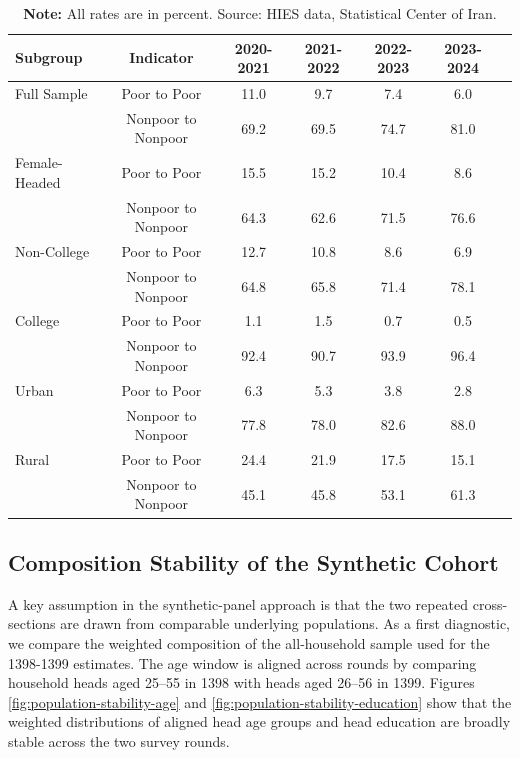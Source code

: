 \documentclass[12pt,a4paper]{article}
\begin{document}
\begin{table}[H]
\scriptsize
\centering
\caption{Key poverty transition rates across periods, by subgroup}
\label{tab:robustness_summary}
\begin{tabular}{lcccccc}
\toprule
Subgroup & Indicator & 2020-2021 & 2021-2022 & 2022-2023 & 2023-2024 \\
\midrule
Full Sample & Poor to Poor & 11.0 & 9.7 & 7.4 & 6.0 \\
& Nonpoor to Nonpoor & 69.2 & 69.5 & 74.7 & 81.0 \\
\addlinespace
Female-Headed & Poor to Poor & 15.5 & 15.2 & 10.4 & 8.6 \\
& Nonpoor to Nonpoor & 64.3 & 62.6 & 71.5 & 76.6 \\
\addlinespace
Non-College & Poor to Poor & 12.7 & 10.8 & 8.6 & 6.9 \\
& Nonpoor to Nonpoor & 64.8 & 65.8 & 71.4 & 78.1 \\
\addlinespace
College & Poor to Poor & 1.1 & 1.5 & 0.7 & 0.5 \\
& Nonpoor to Nonpoor & 92.4 & 90.7 & 93.9 & 96.4 \\
\addlinespace
Urban & Poor to Poor & 6.3 & 5.3 & 3.8 & 2.8 \\
& Nonpoor to Nonpoor & 77.8 & 78.0 & 82.6 & 88.0 \\
\addlinespace
Rural & Poor to Poor & 24.4 & 21.9 & 17.5 & 15.1 \\
& Nonpoor to Nonpoor & 45.1 & 45.8 & 53.1 & 61.3 \\
\bottomrule
\end{tabular}
\caption*{\scriptsize \textbf{Note:} All rates are in percent. Source: HIES data, Statistical Center of Iran.}
\end{table}



\subsection{Composition Stability of the Synthetic Cohort}
A key assumption in the synthetic-panel approach is that the two repeated cross-sections are drawn from comparable underlying populations. As a first diagnostic, we compare the weighted composition of the all-household sample used for the 1398-1399 estimates. The age window is aligned across rounds by comparing household heads aged 25--55 in 1398 with heads aged 26--56 in 1399. Figures \ref{fig:population-stability-age} and \ref{fig:population-stability-education} show that the weighted distributions of aligned head age groups and head education are broadly stable across the two survey rounds.
\end{document}
